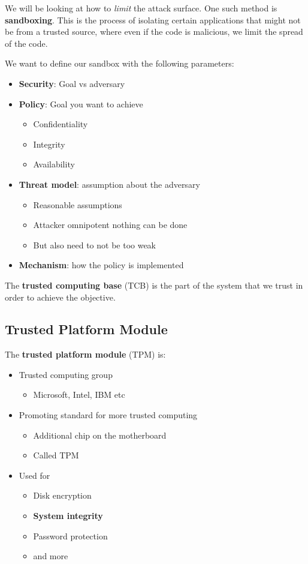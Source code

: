 \documentclass[11pt,a4paper,titlepage,dvipsnames,cmyk]{scrartcl}
\begin{document}
We will be looking at how to \textit{limit} the attack surface. One such method is \textbf{sandboxing}. This is the process of isolating certain applications that might not be from a trusted source, where even if the code is malicious, we limit the spread of the code.

We want to define our sandbox with the following parameters:
\begin{itemize}
    \item \textbf{Security}: Goal vs adversary
    \item \textbf{Policy}: Goal you want to achieve
    \begin{itemize}
        \item Confidentiality
        \item Integrity
        \item Availability
    \end{itemize}
    \item \textbf{Threat model}: assumption about the adversary
    \begin{itemize}
        \item Reasonable assumptions
        \item Attacker omnipotent nothing can be done
        \item But also need to not be too weak
    \end{itemize}
    \item \textbf{Mechanism}: how the policy is implemented
\end{itemize}

The \textbf{trusted computing base} (TCB) is the part of the system that we trust in order to achieve the objective.

\subsection{Trusted Platform Module}
The \textbf{trusted platform module} (TPM) is:
\begin{itemize}
    \item Trusted computing group
    \begin{itemize}
        \item Microsoft, Intel, IBM etc
    \end{itemize}
    \item Promoting standard for more trusted computing
    \begin{itemize}
        \item Additional chip on the motherboard
        \item Called TPM
    \end{itemize}
    \item Used for 
    \begin{itemize}
        \item Disk encryption
        \item \textbf{System integrity}
        \item Password protection
        \item and more
    \end{itemize}
\end{itemize}
\end{document}
